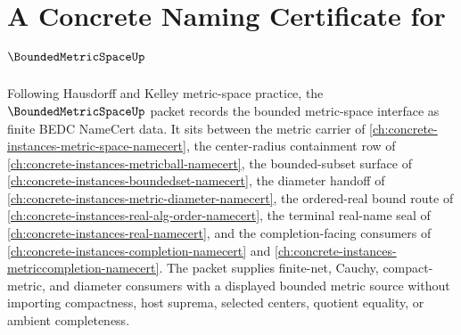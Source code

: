 \chapter{A Concrete Naming Certificate for $\BoundedMetricSpaceUp$}
\label{ch:concrete-instances-bounded-metric-space-namecert}

Following Hausdorff and Kelley metric-space practice, the $\BoundedMetricSpaceUp$ packet records the bounded metric-space interface as finite BEDC NameCert data. It sits between the metric carrier of \autoref{ch:concrete-instances-metric-space-namecert}, the center-radius containment row of \autoref{ch:concrete-instances-metricball-namecert}, the bounded-subset surface of \autoref{ch:concrete-instances-boundedset-namecert}, the diameter handoff of \autoref{ch:concrete-instances-metric-diameter-namecert}, the ordered-real bound route of \autoref{ch:concrete-instances-real-alg-order-namecert}, the terminal real-name seal of \autoref{ch:concrete-instances-real-namecert}, and the completion-facing consumers of \autoref{ch:concrete-instances-completion-namecert} and \autoref{ch:concrete-instances-metriccompletion-namecert}. The packet supplies finite-net, Cauchy, compact-metric, and diameter consumers with a displayed bounded metric source without importing compactness, host suprema, selected centers, quotient equality, or ambient completeness.

